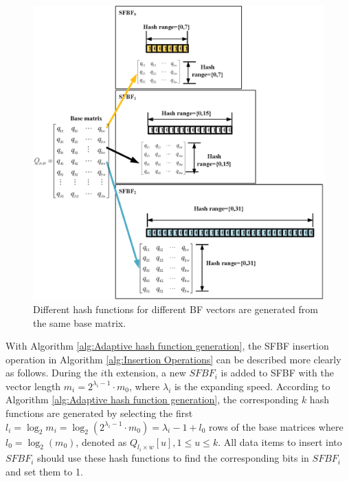 \documentclass[10pt,journal,compsoc]{IEEEtran}
\begin{document}
\begin{figure}[!h]
\centering
\includegraphics[width=3.5 in]{fig/Hash_function_generated_from_base_matrix}
\caption{Different hash functions for different BF vectors are generated from the same base matrix.}
\label{fig:Hash function generated from base matrix}
\end{figure}

With Algorithm \ref{alg:Adaptive hash function generation}, the SFBF insertion operation in Algorithm \ref{alg:Insertion Operations}
 can be described more clearly as follows.
During the $i$th extension, a new $SFBF_i$ is added to SFBF with the vector length ${m_i} = {2^{\lambda_i  - 1}} \cdot {m_0}$, where $\lambda_i$ is the  expanding speed. According to Algorithm \ref{alg:Adaptive hash function generation},
the corresponding $k$ hash functions are generated by selecting the first ${l_i} =\log_2m_i= {\log _2}\left( {2^{\lambda_i  - 1}} \cdot {m_0} \right) = \lambda_i  - 1 + {l_0}$ rows of the base matrices where ${l_0} = {\log _2}\left( {{m_0}} \right)$, denoted as ${Q_{{l_i} \times w}}[u], 1 \le u \le k$. All data items to insert into $SFBF_i$ should use these hash functions to find the corresponding bits in $SFBF_i$ and set them to 1.
\end{document}
